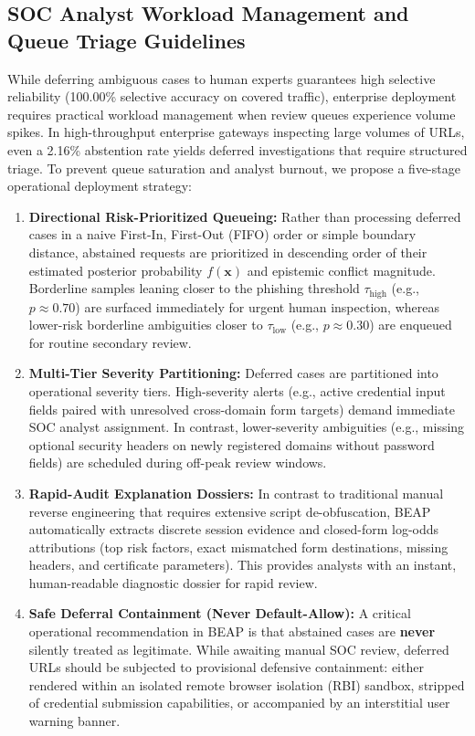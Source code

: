 \documentclass[conference]{IEEEtran}
\begin{document}
\subsection{SOC Analyst Workload Management and Queue Triage Guidelines}\label{soc-workload}

While deferring ambiguous cases to human experts guarantees high selective reliability (100.00\% selective accuracy on covered traffic), enterprise deployment requires practical workload management when review queues experience volume spikes. In high-throughput enterprise gateways inspecting large volumes of URLs, even a 2.16\% abstention rate yields deferred investigations that require structured triage. To prevent queue saturation and analyst burnout, we propose a five-stage operational deployment strategy:

\begin{enumerate}[leftmargin=2.5em]
    \item \textbf{Directional Risk-Prioritized Queueing:} Rather than processing deferred cases in a naive First-In, First-Out (FIFO) order or simple boundary distance, abstained requests are prioritized in descending order of their estimated posterior probability $f(\mathbf{x})$ and epistemic conflict magnitude. Borderline samples leaning closer to the phishing threshold $\tau_{\text{high}}$ (e.g., $p \approx 0.70$) are surfaced immediately for urgent human inspection, whereas lower-risk borderline ambiguities closer to $\tau_{\text{low}}$ (e.g., $p \approx 0.30$) are enqueued for routine secondary review.
    \item \textbf{Multi-Tier Severity Partitioning:} Deferred cases are partitioned into operational severity tiers. High-severity alerts (e.g., active credential input fields paired with unresolved cross-domain form targets) demand immediate SOC analyst assignment. In contrast, lower-severity ambiguities (e.g., missing optional security headers on newly registered domains without password fields) are scheduled during off-peak review windows.
    \item \textbf{Rapid-Audit Explanation Dossiers:} In contrast to traditional manual reverse engineering that requires extensive script de-obfuscation, BEAP automatically extracts discrete session evidence and closed-form log-odds attributions (top risk factors, exact mismatched form destinations, missing headers, and certificate parameters). This provides analysts with an instant, human-readable diagnostic dossier for rapid review.
    \item \textbf{Safe Deferral Containment (Never Default-Allow):} A critical operational recommendation in BEAP is that abstained cases are \textbf{never} silently treated as legitimate. While awaiting manual SOC review, deferred URLs should be subjected to provisional defensive containment: either rendered within an isolated remote browser isolation (RBI) sandbox, stripped of credential submission capabilities, or accompanied by an interstitial user warning banner.

\end{enumerate}
\end{document}
